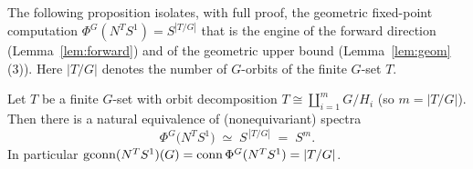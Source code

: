 The following proposition isolates, with full proof, the geometric
fixed-point computation $\Phi^G(N^TS^1)=S^{|T/G|}$ that is the engine of the
forward direction (Lemma~\ref{lem:forward}) and of the geometric upper bound
(Lemma~\ref{lem:geom}(3)). Here $|T/G|$ denotes the number of $G$-orbits of the
finite $G$-set $T$.

\begin{qfiveproposition}\label{prop:phiNT}
Let $T$ be a finite $G$-set with orbit decomposition $T\cong\coprod_{i=1}^{m}G/H_i$
(so $m=|T/G|$). Then there is a natural equivalence of (nonequivariant) spectra
\[
\Phi^G\bigl(N^T S^1\bigr)\;\simeq\;S^{\,|T/G|}\;=\;S^{m}.
\]
In particular $\operatorname{gconn}(N^T S^1)(G)=\operatorname{conn}\Phi^G(N^TS^1)=|T/G|$.
\end{qfiveproposition}

